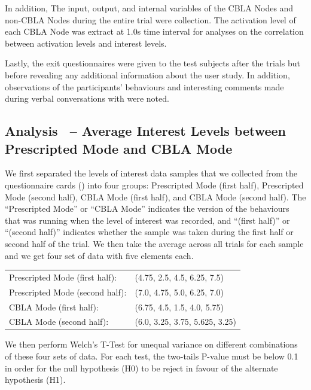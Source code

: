 In addition, The input, output, and internal variables of the CBLA Nodes and non-CBLA Nodes during the entire trial were collection. The activation level of each CBLA Node was extract at 1.0s time interval for analyses on the correlation between activation levels and interest levels. 

Lastly, the exit questionnaires were given to the test subjects after the trials but before revealing any additional information about the user study. In addition, observations of the participants' behaviours and interesting comments made during verbal conversations with were noted. 

 
\subsection{Analysis~ -- Average Interest Levels between Prescripted Mode and CBLA Mode}

We first separated the levels of interest data samples that we collected from the questionnaire cards () into four groups: Prescripted Mode (first half),  Prescripted Mode (second half),  CBLA Mode (first half), and CBLA Mode (second half). The ``Prescripted Mode'' or ``CBLA Mode'' indicates the version of the behaviours that was running when the level of interest was recorded, and ``(first half)'' or ``(second half)'' indicates whether the sample was taken during the first half or second half of the trial. We then take the average across all trials for each sample and we get four set of data with five elements each.

\begin{tabular}{l l}
	Prescripted Mode (first half):      &(4.75, 2.5, 4.5, 6.25, 7.5) \\
	Prescripted Mode (second half):     &(7.0, 4.75, 5.0, 6.25, 7.0) \\
	CBLA Mode (first half):             &(6.75, 4.5, 1.5, 4.0, 5.75) \\
	CBLA Mode (second half):            &(6.0, 3.25, 3.75, 5.625, 3.25)	
\end{tabular}

We then perform Welch's T-Test for unequal variance on different combinations of these four sets of data. For each test, the two-tails P-value must be below 0.1 in order for the null hypothesis (H0) to be reject in favour of the alternate hypothesis (H1).

